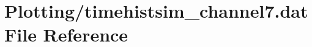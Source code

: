 \hypertarget{Plotting_2timehistsim__channel7_8dat}{}\section{Plotting/timehistsim\+\_\+channel7.dat File Reference}
\label{Plotting_2timehistsim__channel7_8dat}

